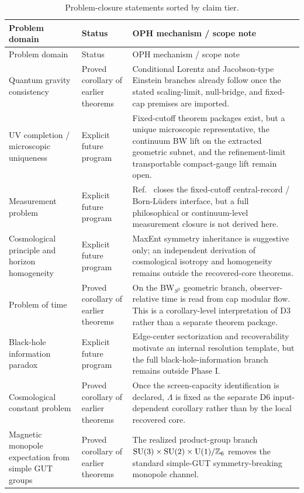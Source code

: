\begin{longtable}{p{} p{} p{}}
\caption{Problem-closure statements sorted by claim tier.}\label{tab:additional-closures}\\
\toprule
Problem domain & Status & OPH mechanism / scope note \\
\midrule
\endfirsthead
\toprule
Problem domain & Status & OPH mechanism / scope note \\
\midrule
\endhead
\bottomrule
\endfoot
Quantum gravity consistency & Proved corollary of earlier theorems & Conditional Lorentz and Jacobson-type Einstein branches already follow once the stated scaling-limit, null-bridge, and fixed-cap premises are imported. \\
UV completion / microscopic uniqueness & Explicit future program & Fixed-cutoff theorem packages exist, but a unique microscopic representative, the continuum BW lift on the extracted geometric subnet, and the refinement-limit transportable compact-gauge lift remain open. \\
Measurement problem & Explicit future program & Ref.~\cite{ophmicrophysics} closes the fixed-cutoff central-record / Born-L\"uders interface, but a full philosophical or continuum-level measurement closure is not derived here. \\
Cosmological principle and horizon homogeneity & Explicit future program & MaxEnt symmetry inheritance is suggestive only; an independent derivation of cosmological isotropy and homogeneity remains outside the recovered-core theorems. \\
Problem of time & Proved corollary of earlier theorems & On the BW\(_{S^2}\) geometric branch, observer-relative time is read from cap modular flow. This is a corollary-level interpretation of D3 rather than a separate theorem package. \\
Black-hole information paradox & Explicit future program & Edge-center sectorization and recoverability motivate an internal resolution template, but the full black-hole-information branch remains outside Phase I. \\
Cosmological constant problem & Proved corollary of earlier theorems & Once the screen-capacity identification is declared, \(\Lambda\) is fixed as the separate D6 input-dependent corollary rather than by the local recovered core. \\
Magnetic monopole expectation from simple GUT groups & Proved corollary of earlier theorems & The realized product-group branch \(\mathrm{SU}(3)\times\mathrm{SU}(2)\times\mathrm{U}(1)/\mathbb Z_6\) removes the standard simple-GUT symmetry-breaking monopole channel. \\

\end{longtable}
